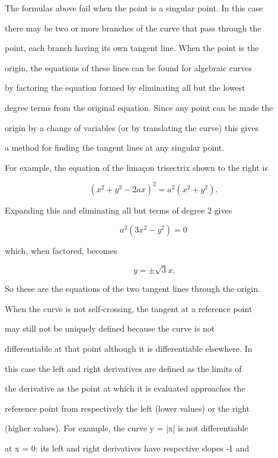 {{{The formulas above fail when the point is a singular point. In this case

there may be two or more branches of the curve that pass through the

point, each branch having its own tangent line. When the point is the

origin, the equations of these lines can be found for algebraic curves

by factoring the equation formed by eliminating all but the lowest

degree terms from the original equation. Since any point can be made the

origin by a change of variables (or by translating the curve) this gives

a method for finding the tangent lines at any singular point.



For example, the equation of the limaçon trisectrix shown to the right is



$$(x^2+y^2-2ax)^2=a^2(x^2+y^2).\,$$



Expanding this and eliminating all but terms of degree 2 gives



$$a^2(3x^2-y^2)=0\,$$ 



which, when factored, becomes



$$y=\pm\sqrt{3}x.$$



So these are the equations of the two tangent lines through the origin.



When the curve is not self-crossing, the tangent at a reference point

may still not be uniquely defined because the curve is not

differentiable at that point although it is differentiable elsewhere. In

this case the left and right derivatives are defined as the limits of

the derivative as the point at which it is evaluated approaches the

reference point from respectively the left (lower values) or the right

(higher values). For example, the curve y = |x| is not differentiable

at x = 0: its left and right derivatives have respective slopes -1 and

}}}
